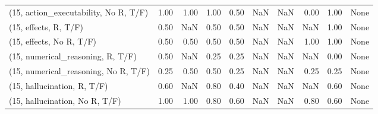 \begin{table*}[h!]
\begin{adjustbox}{width=2\columnwidth,center}
\begin{tabular}{lrrr|rrr|rrr}
(15, action\_executability, No R, T/F) &                      1.00 &                  1.00 &                      1.00 &                          0.50 &                       NaN &                           NaN &                                   0.00 &                               1.00 &                                  None \\
(15, effects, R, T/F)                 &                      0.50 &                   NaN &                      0.50 &                          0.50 &                       NaN &                           NaN &                                    NaN &                               1.00 &                                  None \\
(15, effects, No R, T/F)              &                      0.50 &                  0.50 &                      0.50 &                          0.50 &                       NaN &                           NaN &                                   1.00 &                               1.00 &                                  None \\
(15, numerical\_reasoning, R, T/F)     &                      0.50 &                   NaN &                      0.25 &                          0.25 &                       NaN &                           NaN &                                    NaN &                               0.00 &                                  None \\
(15, numerical\_reasoning, No R, T/F)  &                      0.25 &                  0.50 &                      0.50 &                          0.25 &                       NaN &                           NaN &                                   0.25 &                               0.25 &                                  None \\
(15, hallucination, R, T/F)           &                      0.60 &                   NaN &                      0.80 &                          0.40 &                       NaN &                           NaN &                                    NaN &                               0.60 &                                  None \\
(15, hallucination, No R, T/F)        &                      1.00 &                  1.00 &                      0.80 &                          0.60 &                       NaN &                           NaN &                                   0.80 &                               0.60 &                                  None \\

\end{tabular}
\end{adjustbox}
\end{table*}
